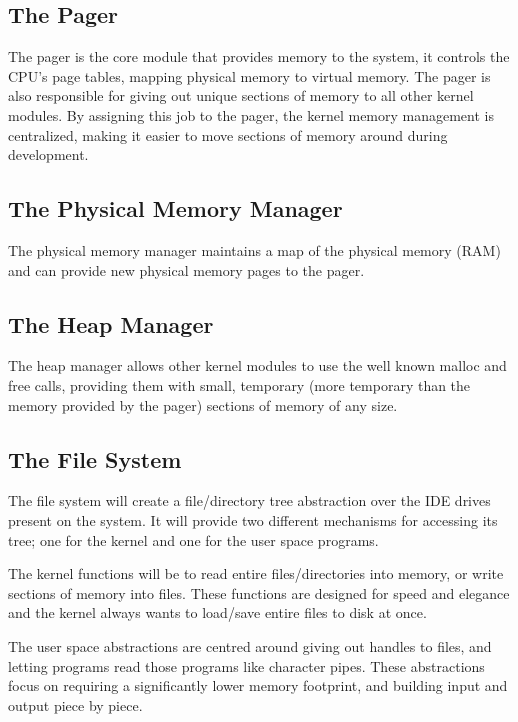 \documentclass[a4paper]{report}
\begin{document}
\subsection{The Pager}

The pager is the core module that provides memory to the system, it controls the CPU's page tables, mapping physical memory to virtual memory. The pager is also responsible for giving out unique sections of memory to all other kernel modules. By assigning this job to the pager, the kernel memory management is centralized, making it easier to move sections of memory around during development.

\subsection{The Physical Memory Manager}

The physical memory manager maintains a map of the physical memory (RAM) and can provide new physical memory pages to the pager.

\subsection{The Heap Manager}

The heap manager allows other kernel modules to use the well known malloc and free calls, providing them with small, temporary (more temporary than the memory provided by the pager) sections of memory of any size.

\subsection{The File System}

The file system will create a file/directory tree abstraction over the IDE drives present on the system. It will provide two different mechanisms for accessing its tree; one for the kernel and one for the user space programs.

The kernel functions will be to read entire files/directories into memory, or write sections of memory into files. These functions are designed for speed and elegance and the kernel always wants to load/save entire files to disk at once.

The user space abstractions are centred around giving out handles to files, and letting programs read those programs like character pipes. These abstractions focus on requiring a significantly lower memory footprint, and building input and output piece by piece.
\end{document}
